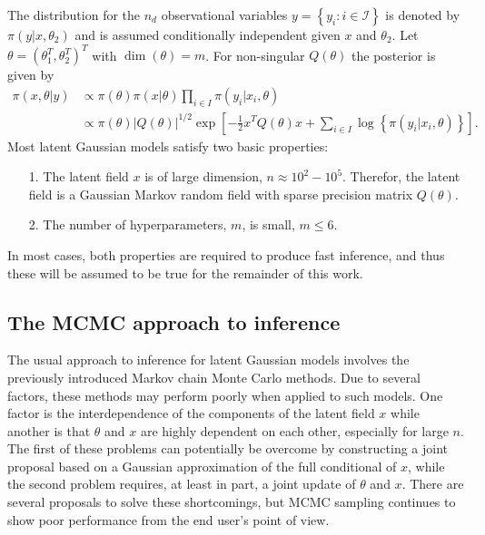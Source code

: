 \documentclass[12pt]{book}
\begin{document}
The distribution for the $n_d$ observational variables $y=\left\lbrace y_i:i\in\mathcal{I}\right\rbrace$ is denoted by $\pi\left(y|x, \theta_2\right)$ and is assumed conditionally independent given $x$ and $\theta_2$. Let $\theta=\left(\theta_1^T,\theta_2^T\right)^T$ with $\dim\left(\theta\right)=m$. For non-singular $Q\left(\theta\right)$ the posterior is given by
\begin{align}
    \pi\left(x,\theta|y\right)&\propto\pi\left(\theta\right)\pi\left(x|\theta\right)\prod_{i\in I}\pi\left(y_i|x_i,\theta\right) \nonumber\\
    &\propto \pi\left(\theta\right)\left|Q\left(\theta\right)\right|^{1/2}\exp\left[-\frac{1}{2}x^TQ\left(\theta\right)x+\sum_{i\in I}\log\left\lbrace\pi\left(y_i|x_i,\theta\right)\right\rbrace\right].
\end{align}
Most latent Gaussian models satisfy two basic properties:
\begin{itemize}
    \item[1.] The latent field $x$ is of large dimension, $n\approx10^2-10^5$. Therefor, the latent field is a Gaussian Markov random field with sparse precision matrix $Q\left(\theta\right)$.
    \item[2.] The number of hyperparameters, $m$, is small, $m\leq6$.
\end{itemize}
In most cases, both properties are required to produce fast inference, and thus these will be assumed to be true for the remainder of this work. \autocite[Cf.][]{rue2009approximate}
\subsection{The MCMC approach to inference}
The usual approach to inference for latent Gaussian models involves the previously introduced Markov chain Monte Carlo methods. Due to several factors, these methods may perform poorly when applied to such models. One factor is the interdependence of the components of the latent field $x$ while another is that $\theta$ and $x$ are highly dependent on each other, especially for large $n$. The first of these problems can potentially be overcome by constructing a joint proposal based on a Gaussian approximation of the full conditional of $x$, while the second problem requires, at least in part, a joint update of $\theta$ and $x$. There are several proposals to solve these shortcomings, but MCMC sampling continues to show poor performance from the end user's point of view. \autocite[Cf.][]{rue2009approximate}
\end{document}
